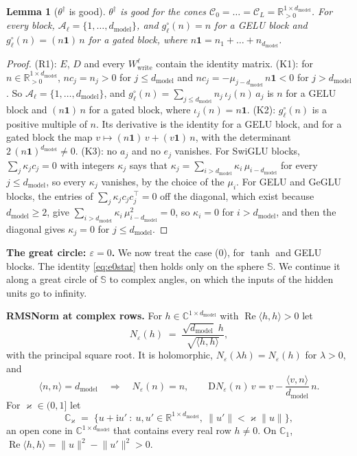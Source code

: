 \documentclass[10pt]{article}
\newtheorem{lemma}[theorem]{Lemma}
\theoremstyle{definition}
\theoremstyle{remark}
\newcommand{\R}{\mathbb{R}}
\newcommand{\Wwrite}{W_{\mathrm{write}}}
\newcommand{\dm}{d_{\mathrm{model}}}
\newcommand{\Der}{\mathrm{D}}
\newcommand{\norm}[1]{\lVert #1\rVert}
\newcommand{\para}[1]{\smallskip\noindent\textbf{#1}\hspace{0.5em}}
\begin{document}
\begin{lemma}[$\theta^\dagger$ is good]\label{lem:gtstar}
$\theta^\dagger$ is good for the cones $\mathcal C_0 = \dots = \mathcal C_L = \R^{1\times\dm}_{>0}$. For every block, $\mathcal A_\ell = \{1, \dots, \dm\}$, and $g^\circ_\ell(n) = n$ for a GELU block and $g^\circ_\ell(n) = (n\mathbf 1)\,n$ for a gated block, where $n\mathbf 1 = n_1 + \dots + n_{\dm}$.
\end{lemma}

\begin{proof}
(R1): $E$, $D$ and every $\Wwrite^{\ell}$ contain the identity matrix. (K1): for $n \in \R^{1\times\dm}_{>0}$, $nc_j = n_j > 0$ for $j \le \dm$ and $nc_j = -\mu_{j-\dm}\,n\mathbf 1 < 0$ for $j > \dm$. So $\mathcal A_\ell = \{1, \dots, \dm\}$, and $g^\circ_\ell(n) = \sum_{j\le\dm}n_j\,\iota_j(n)\,a_j$ is $n$ for a GELU block and $(n\mathbf 1)\,n$ for a gated block, where $\iota_j(n) = n\mathbf 1$. (K2): $g^\circ_\ell(n)$ is a positive multiple of $n$. Its derivative is the identity for a GELU block, and for a gated block the map $v \mapsto (n\mathbf 1)\,v + (v\mathbf 1)\,n$, with the determinant $2\,(n\mathbf 1)^{\dm} \neq 0$. (K3): no $a_j$ and no $e_j$ vanishes. For SwiGLU blocks, $\sum_j\kappa_jc_j = 0$ with integers $\kappa_j$ says that $\kappa_j = \sum_{i>\dm}\kappa_i\,\mu_{i-\dm}$ for every $j \le \dm$, so every $\kappa_j$ vanishes, by the choice of the $\mu_i$. For GELU and GeGLU blocks, the entries of $\sum_j\kappa_jc_jc_j^\top = 0$ off the diagonal, which exist because $\dm \ge 2$, give $\sum_{i>\dm}\kappa_i\,\mu_{i-\dm}^2 = 0$, so $\kappa_i = 0$ for $i > \dm$, and then the diagonal gives $\kappa_j = 0$ for $j \le \dm$.
\end{proof}

\para{The great circle: $\varepsilon = 0$.} We now treat the case (0), for $\tanh$ and GELU blocks. The identity \eqref{eq:e0star} then holds only on the sphere $\mathbb S$. We continue it along a great circle of $\mathbb S$ to complex angles, on which the inputs of the hidden units go to infinity.

\para{RMSNorm at complex rows.} For $h \in \mathbb C^{1\times\dm}$ with $\operatorname{Re}\langle h, h\rangle > 0$ let
\[
N_\varepsilon(h) \;=\; \frac{\sqrt{\dm}\;h}{\sqrt{\langle h, h\rangle}},
\]
with the principal square root. It is holomorphic, $N_\varepsilon(\lambda h) = N_\varepsilon(h)$ for $\lambda > 0$, and
\begin{equation}\label{eq:e0DN}
\langle n, n\rangle = \dm \quad\Longrightarrow\quad N_\varepsilon(n) = n, \qquad \Der N_\varepsilon(n)\,v = v - \frac{\langle v, n\rangle}{\dm}\,n .
\end{equation}
For $\varkappa \in (0, 1]$ let
\[
\mathbb C_\varkappa \;=\; \big\{u + \mathrm iu' \ :\ u, u' \in \R^{1\times\dm},\ \norm{u'} < \varkappa\norm{u}\big\},
\]
an open cone in $\mathbb C^{1\times\dm}$ that contains every real row $h \neq 0$. On $\mathbb C_1$, $\operatorname{Re}\langle h, h\rangle = \norm{u}^2 - \norm{u'}^2 > 0$.
\end{document}
